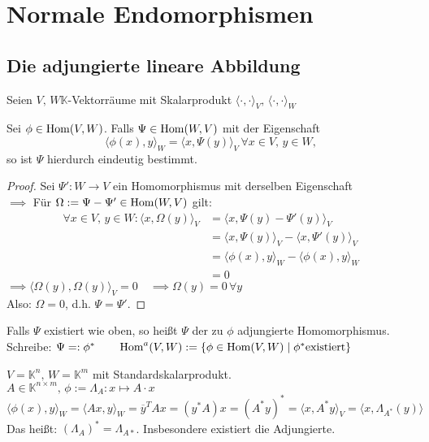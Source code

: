 \documentclass[parskip,a4paper,twoside,DIV15,BCOR12mm]{scrbook}
\begin{document}
\setcounter{chapter}{17}
\chapter{Normale Endomorphismen}
\section{Die adjungierte lineare Abbildung}
Seien \(V,\,W \mathbb{K}\)-Vektorr\"aume mit Skalarprodukt 
\(\langle\cdot,\cdot\rangle_{V},\,\langle\cdot,\cdot\rangle_{W}\)
\begin{lemma}
Sei \(\phi\in\operatorname{Hom}(V,W)\). Falls \(\Psi\in\operatorname{Hom}(W,V)\) mit der Eigenschaft
\[
\langle\phi(x),y\rangle_{W}=\langle x,\Psi(y)\rangle_{V}\,\forall x\in V,\,
y\in W,
\]
so ist \(\Psi\) hierdurch eindeutig bestimmt.
\end{lemma}
\begin{proof}
Sei \(\Psi':W\to V\) ein Homomorphismus mit derselben Eigenschaft\\
\(\implies\) F\"ur \(\Omega:=\Psi-\Psi'\in\operatorname{Hom}(W,V)\) gilt:
\begin{align*}
\forall x\in V,\,y\in W: \langle x,\Omega(y)\rangle_{V}&=
\langle x,\Psi(y)-\Psi'(y)\rangle_{V}\\
&=\langle x,\Psi(y)\rangle_{V}-\langle x,\Psi'(y)\rangle_{V}\\
&=\langle\phi(x),y\rangle_{W}-\langle\phi(x),y\rangle_{W}\\
&=0
\end{align*}
\(\implies \langle\Omega(y),\Omega(y)\rangle_{V}=0\quad\implies
\Omega(y)=0\,\forall y\)\\
Also: \(\Omega=0\), d.h. \(\Psi =\Psi'\).
\end{proof}

\begin{definition}
Falls \(\Psi\) existiert wie oben, so hei\ss t \(\Psi\) der zu \(\phi\) 
adjungierte Homomorphismus.\\
Schreibe: \(\Psi =:\phi^{*}\qquad\operatorname{Hom}^{a}(V,W):=\{\phi\in\operatorname{Hom}(V,W)\mid\phi^{*}\text{existiert}\}\)
\end{definition}

\begin{example}
\(V=\mathbb{K}^{n},\,W=\mathbb{K}^{m}\) mit Standardskalarprodukt.\\
\(A\in\mathbb{K}^{n\times m},\,\phi:=\Lambda_{A}:x\mapsto A\cdot x\)
\[
\langle\phi(x),y\rangle_{W}=\langle Ax,y\rangle_{W}=\overline{y}^{T}Ax=
(y^{*}A)x=(A^{*}y)^{*}=\langle x,A^{*}y\rangle_{V}=\langle x,\Lambda_{A^{*}}(y)\rangle
\]
Das hei\ss t: \((\Lambda_{A})^{*}=\Lambda_{A*}\). Insbesondere existiert die 
Adjungierte.
\end{example}
\end{document}
